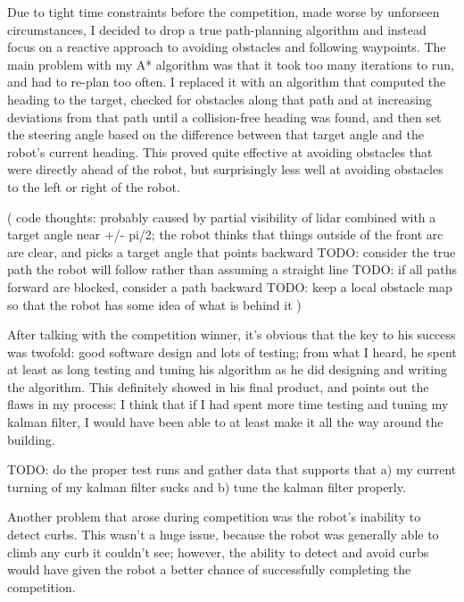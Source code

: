 
Due to tight time constraints before the competition, made worse by unforseen circumstances, I decided to drop a true path-planning algorithm and instead focus on a reactive approach to avoiding obstacles and following waypoints. The main problem with my A* algorithm was that it took too many iterations to run, and had to re-plan too often. I replaced it with an algorithm that computed the heading to the target, checked for obstacles along that path and at increasing deviations from that path until a collision-free heading was found, and then set the steering angle based on the difference between that target angle and the robot's current heading. This proved quite effective at avoiding obstacles that were directly ahead of the robot, but surprisingly less well at avoiding obstacles to the left or right of the robot.

( code thoughts:
  probably caused by partial visibility of lidar combined with a target angle near +/- pi/2; the robot thinks that things outside of the front arc are clear, and picks a target angle that points backward
  TODO: consider the true path the robot will follow rather than assuming a straight line
  TODO: if all paths forward are blocked, consider a path backward
  TODO: keep a local obstacle map so that the robot has some idea of what is behind it
   )

After talking with the competition winner, it's obvious that the key to his success was twofold: good software design and lots of testing; from what I heard, he spent at least as long testing and tuning his algorithm as he did designing and writing the algorithm. This definitely showed in his final product, and points out the flaws in my process: I think that if I had spent more time testing and tuning my kalman filter, I would have been able to at least make it all the way around the building.

TODO: do the proper test runs and gather data that supports that a) my current turning of my kalman filter sucks and b) tune the kalman filter properly.


Another problem that arose during competition was the robot's inability to detect curbs. This wasn't a huge issue, because the robot was generally able to climb any curb it couldn't see; however, the ability to detect and avoid curbs would have given the robot a better chance of successfully completing the competition.
